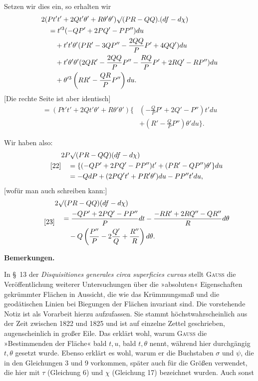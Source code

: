 %
\noindent Setzen wir dies ein, so erhalten wir
\[
\begin{aligned}
&2(Pt't'+2Qt'\theta'+R\theta'\theta')\mathord{\surd}(PR-QQ).(df-d\chi)\\
&\quad=t'^3(-QP'+2PQ'-PP'')du\\
&\qquad+t't'\theta'(PR'-3QP''-\frac{2QQ}{P}P'+4QQ')du\\
&\qquad+t'\theta'\theta'(2QR'-\frac{2QQ}{P}P''-\frac{RQ}{P}P'+2RQ'-RP'')du\\
&\qquad+\theta'^3\left(RR'-\frac{QR}{P}P''\right)du.
\end{aligned}
\]
[Die rechte Seite ist aber identisch]
\[
\begin{aligned}
=(Pt't'+2Qt'\theta'+R\theta'\theta')\{&\left(-\frac QP P'+2Q'-P''\right)t'du\\
&+\left(R'-\frac QP P''\right)\theta'du\}.
\end{aligned}
\]

Wir haben also:
\begin{equation}\tag*{[22]}
\begin{aligned}
&2P\mathord{\surd}(PR-QQ)(df-d\chi)\\
&\quad=\{(-QP'+2PQ'-PP'')t'+(PR'-QP'')\theta'\}du\\
&\quad=-QdP+(2PQ't'+PR'\theta')du-PP''t'du,
\end{aligned}
\end{equation}
[wofür man auch schreiben kann:]
\begin{equation}\tag*{[23]}
\begin{aligned}
&2\mathord{\surd}(PR-QQ)(df-d\chi)\\
&\quad=\frac{-QP'+2PQ'-PP''}{P}dt-\frac{-RR'+2RQ''-QR''}{R}d\theta\\
&\qquad-Q\left(\frac{P''}{P}-2\frac{Q'}{Q}+\frac{R''}{R}\right)d\theta.
\end{aligned}
\end{equation}
\begin{center}\bfseries Bemerkungen.\end{center}
\noindent\hspace*{1.2em}In \S\ 13 der \textit{Disquisitiones generales circa superficies curvas} stellt \textsc{Gauss} die Veröffentlichung weiterer Untersuchungen über die »absoluten« Eigenschaften gekrümmter Flächen in Aussicht, die wie das Krümmungsmaß und die geodätischen Linien bei Biegungen der Flächen invariant sind. Die vorstehende Notiz ist als Vorarbeit hierzu aufzufassen. Sie stammt höchstwahrscheinlich aus der Zeit zwischen 1822 und 1825 und ist auf einzelne Zettel geschrieben, augenscheinlich in großer Eile. Das erklärt wohl, warum \textsc{Gauss} die »Bestimmenden der Fläche« bald $t,u$, bald $t,\theta$ nennt, während hier durchgängig $t,\theta$ gesetzt wurde. Ebenso erklärt es wohl, warum er die Buchstaben $\sigma$ und $\psi$, die in den Gleichungen 3 und 9 vorkommen, später auch für die Größen verwendet, die hier mit $\tau$ (Gleichung 6) und $\chi$ (Gleichung 17) bezeichnet wurden. Auch sonst

